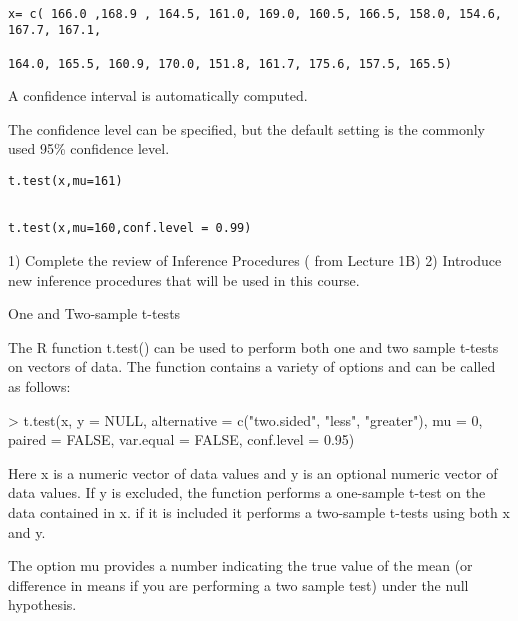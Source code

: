 

 




\begin{framed}
\begin{verbatim}

x= c( 166.0 ,168.9 , 164.5, 161.0, 169.0, 160.5, 166.5, 158.0, 154.6, 167.7, 167.1,

164.0, 165.5, 160.9, 170.0, 151.8, 161.7, 175.6, 157.5, 165.5)
\end{verbatim}
\end{framed}

 
A confidence interval is automatically computed.

The confidence level can be specified, but the default setting is the commonly used 95\% confidence level.

\begin{framed}
\begin{verbatim}
t.test(x,mu=161)
\end{verbatim}
\end{framed}
\begin{framed}
\begin{verbatim}

t.test(x,mu=160,conf.level = 0.99)
\end{verbatim}
\end{framed} 


1) Complete the review of Inference Procedures ( from Lecture 1B)
2) Introduce new inference procedures that will be used in this course.

One and Two-sample t-tests

The R function t.test() can be used to perform both one and two sample t-tests on vectors of data.
The function contains a variety of options and can be called as follows:

> t.test(x, y = NULL, alternative = c("two.sided", "less", "greater"), mu = 0, paired = FALSE, var.equal = FALSE, conf.level = 0.95)

Here x is a numeric vector of data values and y is an optional numeric vector of data values. 
If y is excluded, the function performs a one-sample t-test on the data contained in x.
if it is included it performs a two-sample t-tests using both x and y.

The option mu provides a number indicating the true value of the mean (or difference in means if you are performing a two sample test) under the null hypothesis. 

